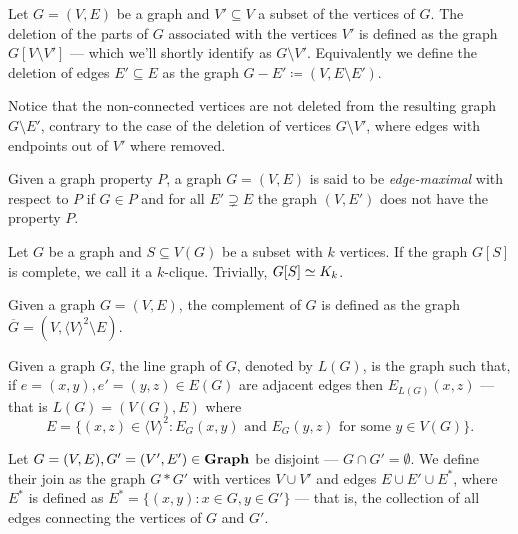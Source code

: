 \begin{definition}
\label{def: deletion-graph}
Let \(G = (V, E)\) be a graph and \(V' \subseteq V\) a subset of the
vertices of \(G\). The deletion of the parts of \(G\) associated with the
vertices \(V'\) is defined as the graph \(G[V \setminus V']\) --- which we'll
shortly identify as \(G \setminus V'\). Equivalently we define the deletion
of edges \(E' \subseteq E\) as the graph \(G - E' \coloneq (V, E \setminus E')\).
\end{definition}

Notice that the non-connected vertices are not deleted from the resulting graph
\(G \setminus E'\), contrary to the case of the deletion of vertices \(G
\setminus V'\), where edges with endpoints out of \(V'\) where removed.

\begin{definition}
\label{def: edge-maximal}
Given a graph property \(P\), a graph \(G = (V, E)\) is said to be
\emph{edge-maximal} with respect to \(P\) if \(G \in P\) and for all \(E'
\supsetneq E\) the graph \((V, E')\) does not have the property \(P\).
\end{definition}

\begin{definition}[Clique]\label{def: clique}
Let \(G\) be a graph and \(S \subseteq V(G)\) be a subset with \(k\) vertices.
If the graph \(G[S]\) is complete, we call it a \(k\)-clique. Trivially,
\(G[S] \simeq K_k\).
\end{definition}

\begin{definition}\label{def: complement-graph}
Given a graph \(G = (V, E)\), the complement of \(G\) is defined as the graph
\(\overline G = (V, \langle V \rangle^2 \setminus E)\).
\end{definition}

\begin{definition}\label{def: line-graph}
Given a graph \(G\), the line graph of \(G\), denoted by \(L(G)\), is the
graph such that, if \(e = (x, y), e' = (y, z) \in E(G)\) are adjacent edges
then \(E_{L(G)}(x, z)\) --- that is \(L(G) = (V(G), E)\) where
\[
  E = \{(x, z) \in \langle V \rangle^2 \colon E_G(x, y) \text{ and } E_G(y, z)
  \text{ for some } y \in V(G)\}.
\]
\end{definition}

\begin{definition}[Join]\label{def: graph-join}
Let \(G = (V, E), G' = (V', E') \in {\textbf{Graph}}\) be disjoint --- \(G \cap G' =
\emptyset\). We define their join as the graph \(G * G'\) with vertices \(V
\cup V'\) and edges \(E \cup E' \cup E^*\), where \(E^*\) is defined as \(E^*
= \{(x, y) \colon x \in G, y \in G'\}\) --- that is, the collection of all edges
connecting the vertices of \(G\) and \(G'\).
\end{definition}

